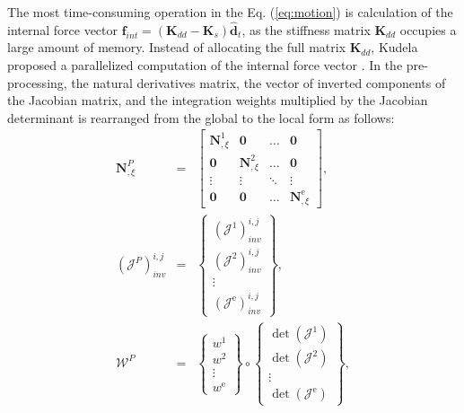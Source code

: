 \documentclass[a4paper,fleqn]{cas-dc}
\begin{document}

The most time-consuming operation in the Eq. (\ref{eq:motion}) is calculation of the internal force vector \(\textbf{f}_{int}=\left(\textbf{K}_{dd}-\textbf{K}_{s}\right)\widehat{\textbf{d}}_{t}\), as the stiffness matrix \(\textbf{K}_{dd}\) occupies a large amount of memory.
Instead of allocating the full matrix \(\textbf{K}_{dd}\), Kudela proposed a parallelized computation of the internal force vector \cite{kudela2016parallel}.
In the pre-processing, the natural derivatives matrix, the vector of inverted components of the Jacobian matrix, and the integration weights multiplied by the Jacobian determinant is rearranged from the global to the local form as follows:
\begin{eqnarray}
	\label{eq:isoparametric}
	\textbf{N}^P_{,\xi} & = & \left[ \begin{array}{cccc}
		\textbf{N}^{1}_{,\xi} & \textbf{0} & \ldots & \textbf{0}\\
		\textbf{0} & \textbf{N}^{2}_{,\xi} & \ldots & \textbf{0}\\
		\vdots & \vdots &  \ddots & \vdots\\
		\textbf{0} & \textbf{0} & \ldots & \textbf{N}^{\mathrm{e}}_{,\xi}
	\end{array}\right],\\
	\label{eq:jacob}
	\left(\mathcal{J}^P\right)^{i,j}_{inv} & = & \left\{ \begin{array}{c}
		\left(\mathcal{J}^{1}\right)^{i,j}_{inv}\\
		\left(\mathcal{J}^{2}\right)^{i,j}_{inv}\\
		\vdots\\
		\left(\mathcal{J}^{\mathrm{e}}\right)^{i,j}_{inv} \end{array}\right\},\\
	\label{eq:intWeights}
	\mathcal{W}^P & = & \left\{ \begin{array}{c}
		w^{1}\\
		w^{2}\\
		\vdots\\
		w^{\mathrm{e}} \end{array}\right\} \circ
	\left\{ \begin{array}{c}
		\det\left(\mathcal{J}^{1}\right)\\
		\det\left(\mathcal{J}^{2}\right)\\
		\vdots\\
		\det\left(\mathcal{J}^{\mathrm{e}}\right)
	\end{array}\right\},
\end{eqnarray}
\end{document}
